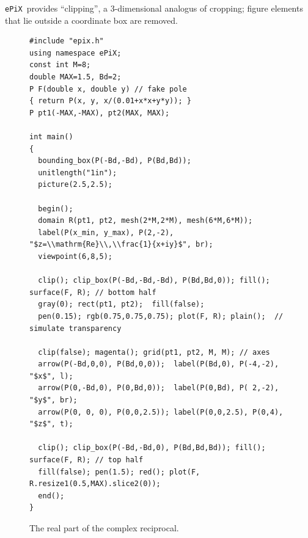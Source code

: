 \documentclass[11pt]{article}
\newcommand{\ePiX}{\texttt{ePiX}}
\begin{document}
\clearpage

\noindent \ePiX\ provides ``clipping'', a 3-dimensional analogus of 
cropping; figure elements that lie outside a coordinate box are removed.

\begin{figure}[hbt]
\begin{center}

\vspace*{-2.25in}
\begin{verbatim}
#include "epix.h"
using namespace ePiX;
const int M=8;
double MAX=1.5, Bd=2;
P F(double x, double y) // fake pole
{ return P(x, y, x/(0.01+x*x+y*y)); }
P pt1(-MAX,-MAX), pt2(MAX, MAX);

int main() 
{
  bounding_box(P(-Bd,-Bd), P(Bd,Bd));
  unitlength("1in");
  picture(2.5,2.5);

  begin();
  domain R(pt1, pt2, mesh(2*M,2*M), mesh(6*M,6*M));
  label(P(x_min, y_max), P(2,-2), "$z=\\mathrm{Re}\\,\\frac{1}{x+iy}$", br);
  viewpoint(6,8,5);

  clip(); clip_box(P(-Bd,-Bd,-Bd), P(Bd,Bd,0)); fill(); surface(F, R); // bottom half
  gray(0); rect(pt1, pt2);  fill(false);
  pen(0.15); rgb(0.75,0.75,0.75); plot(F, R); plain();  // simulate transparency

  clip(false); magenta(); grid(pt1, pt2, M, M); // axes
  arrow(P(-Bd,0,0), P(Bd,0,0));  label(P(Bd,0), P(-4,-2), "$x$", l); 
  arrow(P(0,-Bd,0), P(0,Bd,0));  label(P(0,Bd), P( 2,-2), "$y$", br);
  arrow(P(0, 0, 0), P(0,0,2.5)); label(P(0,0,2.5), P(0,4), "$z$", t);

  clip(); clip_box(P(-Bd,-Bd,0), P(Bd,Bd,Bd)); fill(); surface(F, R); // top half
  fill(false); pen(1.5); red(); plot(F, R.resize1(0.5,MAX).slice2(0));
  end();
}
\end{verbatim}
\caption{The real part of the complex reciprocal.}
\label{fig:pole}
\end{center}
\end{figure}

\clearpage
\end{document}
